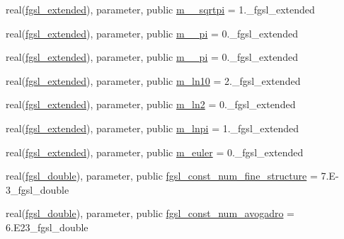\begin{DoxyCompactItemize}
real(\hyperlink{namespacefgsl_a9f38abe97062020e8a507aaa5bc683ab}{fgsl\+\_\+extended}), parameter, public \hyperlink{namespacefgsl_a20272585dc8f0b54e493f4717330469a}{m\+\_\+\_\+sqrtpi} = 1.\+\_\+fgsl\+\_\+extended
\item 
real(\hyperlink{namespacefgsl_a9f38abe97062020e8a507aaa5bc683ab}{fgsl\+\_\+extended}), parameter, public \hyperlink{namespacefgsl_a10fdf50a29d35a63b13bc641ed465051}{m\+\_\+\_\+pi} = 0.\+\_\+fgsl\+\_\+extended
\item 
real(\hyperlink{namespacefgsl_a9f38abe97062020e8a507aaa5bc683ab}{fgsl\+\_\+extended}), parameter, public \hyperlink{namespacefgsl_a28e530e58a51ac2bbce00674f617bbbd}{m\+\_\+\_\+pi} = 0.\+\_\+fgsl\+\_\+extended
\item 
real(\hyperlink{namespacefgsl_a9f38abe97062020e8a507aaa5bc683ab}{fgsl\+\_\+extended}), parameter, public \hyperlink{namespacefgsl_a152b62af261c671c54b99ac278df759d}{m\+\_\+ln10} = 2.\+\_\+fgsl\+\_\+extended
\item 
real(\hyperlink{namespacefgsl_a9f38abe97062020e8a507aaa5bc683ab}{fgsl\+\_\+extended}), parameter, public \hyperlink{namespacefgsl_a126c02aa2554290ff648243425e03ace}{m\+\_\+ln2} = 0.\+\_\+fgsl\+\_\+extended
\item 
real(\hyperlink{namespacefgsl_a9f38abe97062020e8a507aaa5bc683ab}{fgsl\+\_\+extended}), parameter, public \hyperlink{namespacefgsl_ae9aff58d6fcadaab60410424796cd713}{m\+\_\+lnpi} = 1.\+\_\+fgsl\+\_\+extended
\item 
real(\hyperlink{namespacefgsl_a9f38abe97062020e8a507aaa5bc683ab}{fgsl\+\_\+extended}), parameter, public \hyperlink{namespacefgsl_ab8079b9a6e17b1def176e97feda2a841}{m\+\_\+euler} = 0.\+\_\+fgsl\+\_\+extended
\item 
real(\hyperlink{namespacefgsl_a9af5113378e0f000eb479d3f90196ddf}{fgsl\+\_\+double}), parameter, public \hyperlink{namespacefgsl_aa12fc22d559b707d7e1e63ac17c596cb}{fgsl\+\_\+const\+\_\+num\+\_\+fine\+\_\+structure} = 7.\+E-\/3\+\_\+fgsl\+\_\+double
\item 
real(\hyperlink{namespacefgsl_a9af5113378e0f000eb479d3f90196ddf}{fgsl\+\_\+double}), parameter, public \hyperlink{namespacefgsl_a009cf79cdb578326cbceea51aa302e53}{fgsl\+\_\+const\+\_\+num\+\_\+avogadro} = 6.\+E23\+\_\+fgsl\+\_\+double
\item 

\end{DoxyCompactItemize}
